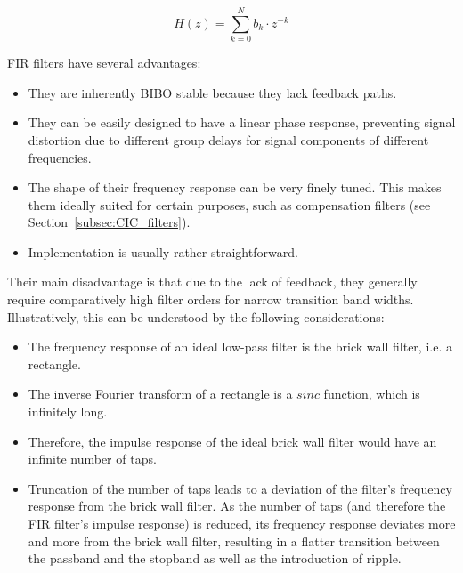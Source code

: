 \begin{equation}
    \label{eq:fir_filter}
    H(z) = \sum_{k=0}^{N} b_k \cdot z^{-k}
\end{equation}

FIR filters have several advantages:

\begin{itemize}\tightlist
    \item
        They are inherently BIBO stable because they lack feedback paths.
    \item
        They  can  be  easily  designed  to  have  a  linear  phase  response,
        preventing signal distortion due to  different group delays for signal
        components of different frequencies.
    \item
        The shape of  their frequency response can be  very finely tuned. This
        makes them ideally  suited for certain purposes,  such as compensation
        filters (see Section~\ref{subsec:CIC_filters}).
    \item
        Implementation is usually rather straightforward.
\end{itemize}

Their  main  disadvantage   is  that  due  to  the  lack   of  feedback,  they
generally require comparatively high filter  orders for narrow transition band
widths. Illustratively, this can be understood by the following considerations:
\begin{itemize}\tightlist
    \item
        The frequency response of an ideal low-pass filter is the brick wall
        filter, i.e. a rectangle.
    \item
        The inverse  Fourier transform  of a rectangle  is a  $sinc$ function,
        which is infinitely long.
    \item
        Therefore, the impulse  response of the ideal brick  wall filter would
        have an infinite number of taps.
    \item
        Truncation of the number of taps  leads to a deviation of the filter's
        frequency response from the brick wall  filter.  As the number of taps
        (and  therefore the  FIR filter's  impulse response)  is reduced,  its
        frequency response deviates more and  more from the brick wall filter,
        resulting  in  a  flatter  transition between  the  passband  and  the
        stopband as well as the introduction of ripple.
\end{itemize}

